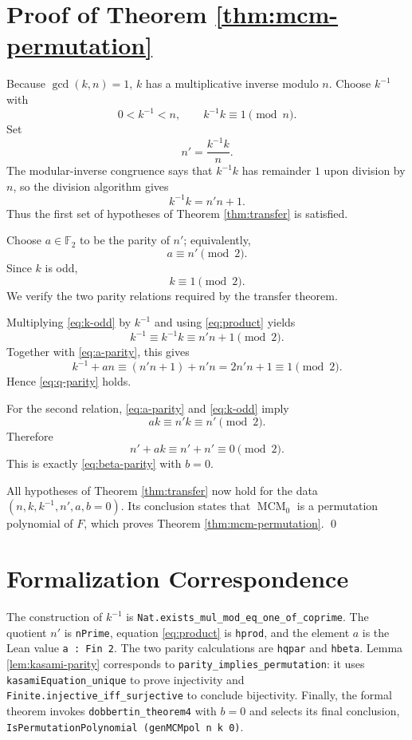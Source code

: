 \documentclass[11pt]{article}
\newcommand{\F}{\mathbb{F}}
\newcommand{\MCM}{\operatorname{MCM}}
\begin{document}
\section{Proof of Theorem \ref{thm:mcm-permutation}}

Because $\gcd(k,n)=1$, $k$ has a multiplicative inverse modulo $n$.  Choose
$k^{-1}$ with
\[
  0<k^{-1}<n,
  \qquad
  k^{-1}k\equiv1\pmod n.
\]
Set
\[
  n'=\frac{k^{-1}k}{n}.
\]
The modular-inverse congruence says that $k^{-1}k$ has remainder $1$ upon
division by $n$, so the division algorithm gives
\begin{equation}
\label{eq:product}
  k^{-1}k=n'n+1.
\end{equation}
Thus the first set of hypotheses of Theorem \ref{thm:transfer} is satisfied.

Choose $a\in\F_2$ to be the parity of $n'$; equivalently,
\begin{equation}
\label{eq:a-parity}
  a\equiv n'\pmod2.
\end{equation}
Since $k$ is odd,
\begin{equation}
\label{eq:k-odd}
  k\equiv1\pmod2.
\end{equation}
We verify the two parity relations required by the transfer theorem.

Multiplying \eqref{eq:k-odd} by $k^{-1}$ and using \eqref{eq:product}
yields
\[
  k^{-1}\equiv k^{-1}k\equiv n'n+1\pmod2.
\]
Together with \eqref{eq:a-parity}, this gives
\[
  k^{-1}+an
  \equiv (n'n+1)+n'n
  =2n'n+1
  \equiv1\pmod2.
\]
Hence \eqref{eq:q-parity} holds.

For the second relation, \eqref{eq:a-parity} and \eqref{eq:k-odd} imply
\[
  ak\equiv n'k\equiv n'\pmod2.
\]
Therefore
\[
  n'+ak\equiv n'+n'\equiv0\pmod2.
\]
This is exactly \eqref{eq:beta-parity} with $b=0$.

All hypotheses of Theorem \ref{thm:transfer} now hold for the data
$(n,k,k^{-1},n',a,b=0)$.  Its conclusion states that $\MCM_0$ is a
permutation polynomial of $F$, which proves Theorem \ref{thm:mcm-permutation}.
\qed

\section{Formalization Correspondence}

The construction of $k^{-1}$ is
\verb|Nat.exists_mul_mod_eq_one_of_coprime|.  The quotient $n'$ is
\verb|nPrime|, equation \eqref{eq:product} is \verb|hprod|, and the element
$a$ is the Lean value \verb|a : Fin 2|.  The two parity calculations are
\verb|hqpar| and \verb|hbeta|.  Lemma \ref{lem:kasami-parity} corresponds to
\verb|parity_implies_permutation|: it uses \verb|kasamiEquation_unique| to
prove injectivity and \verb|Finite.injective_iff_surjective| to conclude
bijectivity.  Finally, the formal theorem invokes
\verb|dobbertin_theorem4| with $b=0$ and selects its final conclusion,
\verb|IsPermutationPolynomial (genMCMpol n k 0)|.
\end{document}

